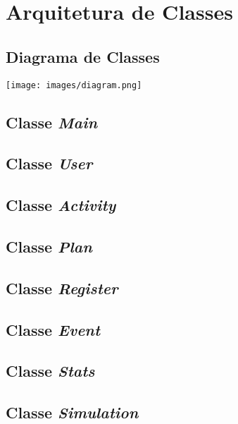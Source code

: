 \documentclass[a4paper,12pt]{scrreprt}
\begin{document}

\chapter{Arquitetura de Classes}
\section{Diagrama de Classes}
\begin{center}
    \texttt{[image: images/diagram.png]}
\end{center}
\section{Classe \textit{Main}}
\section{Classe \textit{User}}
\section{Classe \textit{Activity}}
\section{Classe \textit{Plan}}
\section{Classe \textit{Register}}
\section{Classe \textit{Event}}
\section{Classe \textit{Stats}}
\section{Classe \textit{Simulation}}


\end{document}
